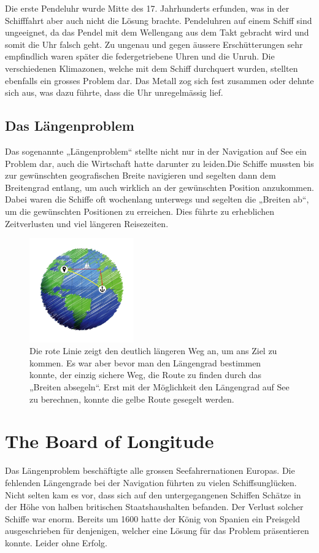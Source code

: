 \begin{refsection}
Die erste Pendeluhr wurde Mitte des 17. Jahrhunderts erfunden, was in der Schifffahrt aber auch nicht die Lösung brachte. Pendeluhren auf einem Schiff sind ungeeignet, da das Pendel mit dem Wellengang aus dem Takt gebracht wird und somit die Uhr falsch geht.
Zu ungenau und gegen äussere Erschütterungen sehr empfindlich waren später die federgetriebene Uhren und die Unruh. Die verschiedenen Klimazonen, welche mit dem Schiff durchquert wurden, stellten ebenfalls ein grosses Problem dar. Das Metall zog sich fest zusammen oder dehnte sich aus, was dazu führte, dass die Uhr unregelmässig lief.

\subsection{Das Längenproblem}
Das sogenannte „Längenproblem“ stellte nicht nur in der Navigation auf See ein Problem dar, auch die Wirtschaft hatte darunter zu leiden.Die Schiffe mussten bis zur gewünschten geografischen Breite navigieren und segelten dann dem Breitengrad entlang, um auch wirklich an der gewünschten Position anzukommen. Dabei waren die Schiffe oft wochenlang unterwegs und segelten die „Breiten ab“, um die gewünschten Positionen zu erreichen. Dies führte zu erheblichen Zeitverlusten und viel längeren Reisezeiten.


\begin{figure}[htbp]
\centering
\includegraphics[width=0.4\textwidth]{kugel/Breitensegeln.jpg}
\caption{Die rote Linie zeigt den deutlich längeren Weg an, um ans Ziel zu kommen. Es war aber bevor man den Längengrad bestimmen konnte, der einzig sichere Weg, die Route zu finden durch das „Breiten absegeln“. Erst mit der Möglichkeit den Längengrad auf See zu berechnen, konnte die gelbe Route gesegelt werden.}
\end{figure}


\section{The Board of Longitude}
Das Längenproblem beschäftigte alle grossen Seefahrernationen Europas. Die fehlenden Längengrade bei der Navigation führten zu vielen Schiffsunglücken. Nicht selten kam es vor, dass sich auf den untergegangenen Schiffen Schätze in der Höhe von halben britischen Staatshaushalten befanden. Der Verlust solcher Schiffe war enorm.
Bereits um 1600 hatte der König von Spanien ein Preisgeld ausgeschrieben für denjenigen, welcher eine Lösung für das Problem präsentieren konnte. Leider ohne Erfolg.


\end{refsection}
